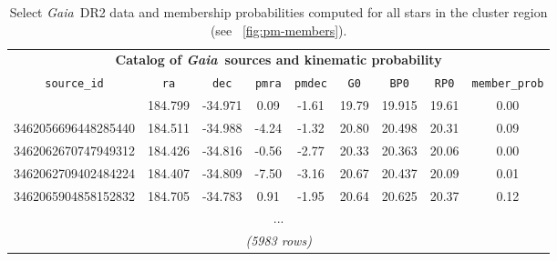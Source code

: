 \documentclass[twocolumn]{aastex62}
\newcommand{\acronym}[1]{{\small{#1}}}
\newcommand{\gaia}{\textsl{Gaia}}
\newcommand{\DR}[1]{\acronym{DR#1}}
\begin{document}
\begin{table}[h!]
    \centering
    \begin{tabular}{c | c | c | c | c | c | c | c | c}
        \multicolumn{9}{c}{\textbf{Catalog of \gaia\ sources and kinematic probability}}\\
        \texttt{source\_id} & \texttt{ra} & \texttt{dec} & \texttt{pmra} & \texttt{pmdec} & \texttt{G0} & \texttt{BP0} & \texttt{RP0} & \texttt{member\_prob} \\
        \tableline
        3462048793708019200 & 184.799 & -34.971 &  0.09 & -1.61 & 19.79 & 19.915 & 19.61 & 0.00 \\
        3462056696448285440 & 184.511 & -34.988 & -4.24 & -1.32 & 20.80 & 20.498 & 20.31 & 0.09 \\
        3462062670747949312 & 184.426 & -34.816 & -0.56 & -2.77 & 20.33 & 20.363 & 20.06 & 0.00 \\
        3462062709402484224 & 184.407 & -34.809 & -7.50 & -3.16 & 20.67 & 20.437 & 20.09 & 0.01 \\
        3462065904858152832 & 184.705 & -34.783 &  0.91 & -1.95 & 20.64 & 20.625 & 20.37 & 0.12 \\
        \multicolumn{9}{c}{...}\\
        \multicolumn{9}{c}{\textit{(5983 rows)}}
    \end{tabular}
    \caption{Select \gaia\ \DR{2} data and membership probabilities computed for all stars in the cluster region (see \figurename~\ref{fig:pm-members}).}
    \label{tbl:gaiadata}
\end{table}
\end{document}
